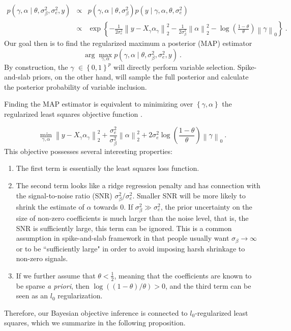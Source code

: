 \documentclass[11pt]{article}%
\numberwithin{equation}{section}
\theoremstyle{plain}
\begin{document}
$$
\begin{array}{rcl}
p\left(\gamma, \alpha \mid \theta, \sigma_\beta^2, \sigma_e^2, y\right) & \propto &
p\left(\gamma, \alpha \mid \theta, \sigma_\beta^2\right)
p\left(y \mid \gamma, \alpha, \theta, \sigma_e^2\right)\\
& \propto &
\exp\left\{-\frac1{2\sigma_e^2}\left\|y - X_\gamma \alpha_\gamma\right\|_2^2
-\frac1{2\sigma_\beta^2}\left\|\alpha\right\|_2^2
-\log\left(\frac{1-\theta}{\theta}\right)
\left\|\gamma\right\|_0
\right\} \ .
\end{array}
$$
Our goal then is to find the regularized maximum a posterior (MAP) estimator $$\arg\max\limits_{\gamma, \alpha}p\left(\gamma, \alpha \mid \theta, \sigma_\beta^2, \sigma_e^2, y \right) \ .$$By construction, the $\gamma$ $\in\left\{0, 1\right\}^p$ will directly perform variable selection.  Spike-and-slab priors, on the other hand, will sample the full posterior and calculate the posterior probability of variable inclusion.

Finding the MAP estimator is equivalent to minimizing over $\left\{\gamma, \alpha\right\}$ the regularized least squares objective function \citep{soussen2011}.

\begin{equation}
\label{obj:map}
\min\limits_{\gamma, \alpha}\left\|y - X_\gamma \alpha_\gamma\right\|_2^2
+ \frac{\sigma_e^2}{\sigma_\beta^2}\left\|\alpha\right\|_2^2
+ 2\sigma_e^2\log\left(\frac{1-\theta}{\theta}\right)
\left\|\gamma\right\|_0 \ .
\end{equation}
This objective possesses several interesting properties:
\begin{enumerate}
\item The first term is essentially the least squares loss function. 
\item The second term looks like a ridge regression penalty and has connection with the signal-to-noise ratio (SNR) $\sigma_\beta^2/\sigma_e^2$.  Smaller SNR will be more likely to shrink the estimate of $\alpha$ towards $0$.  If $\sigma_\beta^2 \gg \sigma_e^2$, the prior uncertainty on the size of non-zero coefficients is much larger than the noise level, that is, the SNR is sufficiently large, this term can be ignored.  This is a common assumption in spike-and-slab framework in that people usually want $\sigma_\beta \to \infty$ or to be ``sufficiently large" in order to avoid imposing harsh shrinkage to non-zero signals.
\item If we further assume that $\theta < \frac12$, meaning that the coefficients are known to be sparse \textit{a priori}, then $\log\left(\left(1-\theta\right) / \theta\right) > 0$, and the third term can be seen as an $l_0$ regularization.
\end{enumerate}
Therefore, our Bayesian objective inference is connected to $l_0$-regularized least squares, which we summarize in the following proposition.
\end{document}
